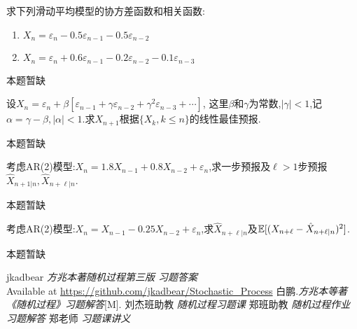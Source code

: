 \begin{problem}{4.39}
求下列滑动平均模型的协方差函数和相关函数:
\begin{enumerate}[label=(\arabic*)]
	\item $X_n = \varepsilon_n - 0.5\varepsilon _{n-1} - 0.5\varepsilon _{n-2}$
	\item $X_n = \varepsilon_n + 0.6\varepsilon _{n-1} - 0.2\varepsilon _{n-2} - 0.1\varepsilon _{n-3}$
\end{enumerate}
\end{problem}
\begin{solution}
	本题暂缺
\end{solution}

\begin{problem}{4.40}
设$X_n=\varepsilon _n + \beta [\varepsilon _{n-1} + \gamma \varepsilon _{n-2} + \gamma ^2 \varepsilon _{n-3}+\cdots ]$,
这里$\beta$和$\gamma$为常数,$|\gamma|<1$,记$\alpha=\gamma - \beta ,|\alpha|<1$.求$X_{n+1}$根据$\{X_k, k\leqslant n\}$的线性最佳预报.
\end{problem}
\begin{solution}
	本题暂缺
\end{solution}

\begin{problem}{4.41}
考虑AR(2)模型:$X_n=1.8X_{n-1}+0.8X_{n-2}+\varepsilon _n$,求一步预报及$\ell >1$步预报$\hat{X}_{n+1|n},\hat{X}_{n+\ell |n}$.
\end{problem}
\begin{solution}
	本题暂缺
\end{solution}

\begin{problem}{4.42}
考虑AR(2)模型:$X_n=X_{n-1}-0.25X_{n-2}+\varepsilon _n$,求$\hat{X}_{n+\ell |n}$及$\mathbb{E}[(X_{n+\ell}-\hat{X}_{n+\ell |n})^2]$.
\end{problem}
\begin{solution}
	本题暂缺
\end{solution}

\clearpage
{}
\begin{thebibliography}{99}
	jkadbear \emph{方兆本著随机过程第三版 习题答案}\\ Available at \url{https://github.com/jkadbear/Stochastic_Process}
	白鹏.\emph{方兆本等著《随机过程》习题解答}[M].
	刘杰班助教 \emph{随机过程习题课}
	郑班助教 \emph{随机过程作业习题解答}
	郑老师 \emph{习题课讲义}
\end{thebibliography}

